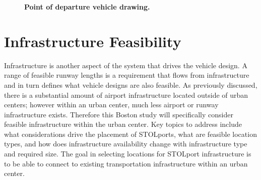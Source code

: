 \documentclass[]{aiaa-tc}%
\begin{document}
\begin{figure}[h!]
 \begin{subfigmatrix}{2}%
 \end{subfigmatrix}
    \caption{\textbf{Point of departure vehicle drawing.}}
 \label{f:vehicle}
 \end{figure}

\section{Infrastructure Feasibility}
Infrastructure is another aspect of the system that drives the vehicle design. A range of feasible runway lengths is a requirement that flows from infrastructure and in turn defines what vehicle designs are also feasible. As previously discussed, there is a substantial amount of airport infrastructure located outside of urban centers; however within an urban center, much less airport or runway infrastructure exists. Therefore this Boston study will specifically consider feasible infrastructure within the urban center.  Key topics to address include what considerations drive the placement of STOLports, what are feasible location types, and how does infrastructure availability change with infrastructure type and required size. The goal in selecting locations for STOLport infrastructure is to be able to connect to existing transportation infrastructure within an urban center.
\end{document}
